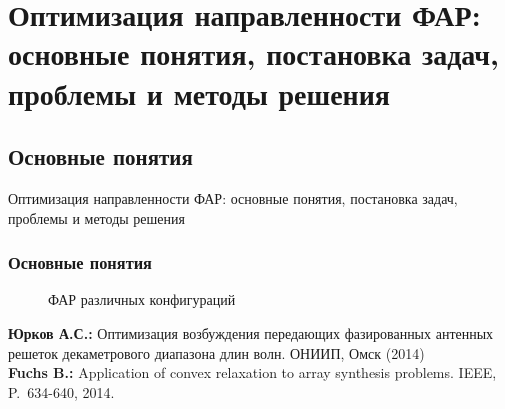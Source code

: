 \section{Оптимизация направленности ФАР: основные понятия, постановка задач, проблемы и методы решения}
\subsection{Основные понятия}
\begin{frame}
    \begin{center}
        \Huge
        Оптимизация направленности ФАР: основные понятия, постановка задач, проблемы и методы решения
    \end{center}
\end{frame}

\begin{frame}
    \frametitle{Основные понятия}
    \begin{center}
        \begin{figure}
            \begin{minipage}[h]{0.42\linewidth}
            \end{minipage}
            \hfill
            \begin{minipage}[h]{0.42\linewidth}
            \end{minipage}
            \begin{minipage}[h]{0.42\linewidth}
            \end{minipage}
            \hfill
            \begin{minipage}[h]{0.42\linewidth}
            \end{minipage}
            \label{ris:bve_bvd}
            \caption{ФАР различных конфигураций}
        \end{figure}

    \end{center}
    \footnotesize { \textbf{Юрков А.С.:} Оптимизация возбуждения передающих фазированных антенных решеток декаметрового диапазона длин волн. ОНИИП, Омск (2014)\\
    \textbf{Fuchs B.:} Application of convex relaxation to array synthesis problems. IEEE, P.~634-640, 2014.
    }
\end{frame}


